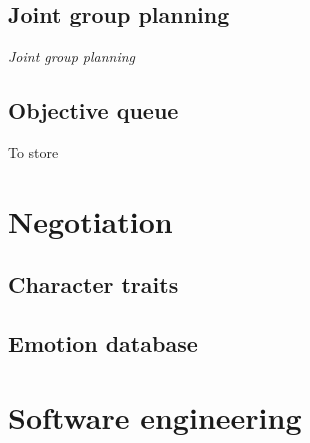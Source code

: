 \documentclass[pdftex,12pt,a4paper]{report}
\begin{document}
\subsection{Joint group planning}

\textit{Joint group planning} 



\subsection{Objective queue}

To store



\section{Negotiation} 

\subsection{Character traits}

\subsection{Emotion database}


\section{Software engineering}
\end{document}
